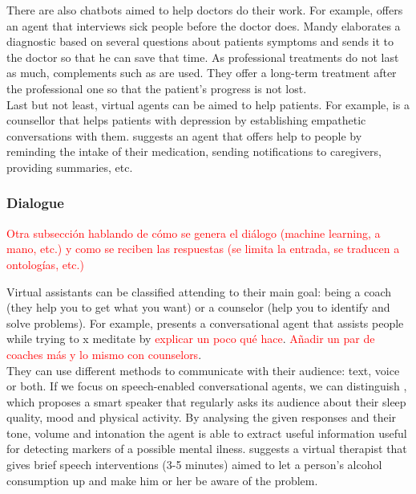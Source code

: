 \documentclass[12pt,english]{article}
\begin{document}
There are also chatbots aimed to help doctors do their work. For example, \cite{Ni201738} offers an agent that interviews sick people before the doctor does. Mandy elaborates a diagnostic based on several questions about patients symptoms and sends it to the doctor so that he can save that time. As professional treatments do not last as much, complements such as \cite{DAlfonso2017} are used. They offer a long-term treatment after the professional one so that the patient's progress is not lost. \\

Last but not least, virtual agents can be aimed to help patients. For example, \cite{Harilal2020349} is a counsellor that helps patients with depression by establishing empathetic conversations with them. \cite{Roca2020954} suggests an agent that offers help to people by reminding the intake of their medication, sending notifications to caregivers, providing summaries, etc.


\subsubsection{Dialogue}

\textcolor{red}{Otra subsección hablando de cómo se genera el diálogo (machine learning, a mano, etc.) y como se reciben las respuestas (se limita la entrada, se traducen a ontologías, etc.)}

Virtual assistants can be classified attending to their main goal: being a coach (they help you to get what you want) or a counselor (help you to identify and solve problems). For example, \cite{HUDLICKA2013160} presents a conversational agent that assists people while trying to x meditate by \textcolor{red}{explicar un poco qué hace}. \textcolor{red}{ Añadir un par de coaches más y lo mismo con counselors}.\\

They can use different methods to communicate with their audience: text, voice or both. If we focus on speech-enabled conversational agents, we can distinguish \cite{Maharjan2019929}, which proposes a smart speaker that regularly asks its audience about their sleep quality, mood and physical activity. By analysing the given responses and their tone, volume and  intonation the agent is able to extract useful information useful for detecting markers of a possible mental ilness. \cite{Yasavur2014381} suggests a virtual therapist that gives brief speech interventions (3-5 minutes) aimed to let a person's alcohol consumption up and make him or her be aware of the problem.\\
\end{document}
